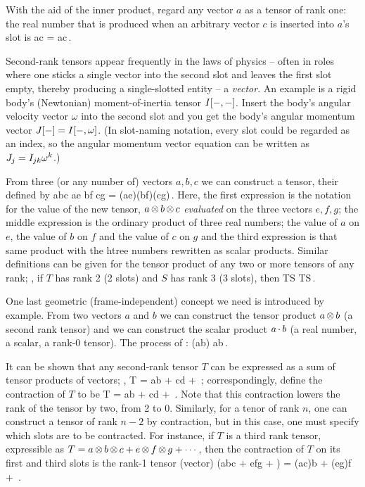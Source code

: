 With the aid of the inner product, regard any vector $a$ as a tensor of rank one: the real number that is produced when an arbitrary vector $c$ is inserted into $a$'s slot is
\beq
a\vat c = a\iprod c\,.
\eeq

Second-rank tensors appear frequently in the laws of physics -- often in roles where one sticks a single vector into the second slot and leaves the first slot empty, thereby producing a single-slotted entity -- a \emph{vector}. An example is a rigid body's (Newtonian) moment-of-inertia tensor $I\!\left[{-,-}\right]$. Insert the body's angular velocity vector $\omega$ into the second slot and you get  the body's angular momentum vector $J\!\left[{-}\right] = I\!\left[{-, \omega}\right]$. (In slot-naming notation, every slot could be regarded as an index, so the angular momentum vector equation can be written as ${J}_{j} = I_{jk}{\omega}^{k}$.)

From three (or any number of) vectors $a,b,c$ we can construct a tensor, their  defined by
\beq
a\tprod b\tprod c  a\vat e b\vat f c\vat g = (a\iprod e)(b\iprod f)(c\iprod g)\,.
\eeq
Here, the first expression is the notation for the value of the new tensor, $a\operatorname{\otimes} b\operatorname{\otimes} c$ \emph{evaluated} on the three vectors $e,f,g$; the middle expression is the ordinary product of three real numbers; the value of $a$ on $e$, the value of $b$ on $f$ and the value of $c$ on $g$ and the third expression is that same product with the htree numbers rewritten as scalar products. Similar definitions can be given for the tensor product of any two or more tensors of any rank; \eg, if $T$ has rank 2 (2 slots) and $S$ has rank 3 (3 slots), then
\beq
T\tprod S  TS\,.
\eeq

One last geometric (frame-independent) concept we need is  introduced by example. From two vectors $a$ and $b$ we can construct the tensor product $a\operatorname{\otimes} b$ (a second rank tensor) and we can construct the scalar product $a\operatorname{\cdot} b$ (a real number, \aka a scalar, \aka a rank-0 tensor). The process of :
\beq
\tcont(a\tprod b)  a\iprod b\,.
\eeq

It can be shown that any second-rank tensor $T$ can be expressed as a sum of tensor products of vectors; \viz,
\beq
T = a\tprod b + c\tprod d + \dotsb\,;
\eeq
correspondingly, define the contraction of $T$ to be 
\beq
\tcont T = a\iprod b + c\iprod d + \dotsb\,.
\eeq
Note that this contraction lowers the rank of the tensor by two, from 2 to 0. Similarly, for a tenor of rank $n$, one can construct a tensor of rank $n-2$ by contraction, but in this case, one must specify which slots are to be contracted. For instance, if $T$ is a third rank tensor, expressible as $T = a\operatorname{\otimes} b\operatorname{\otimes} c + e\operatorname{\otimes} f\operatorname{\otimes} g + \dotsb$, then the contraction of $T$ on its first and third slots is the rank-1 tensor (vector)
\beq
{}(a\tprod b\tprod c + e\tprod f\tprod g + \dotsb) = (a\iprod c)b + (e\iprod g)f + \dotsb \,.
\eeq


